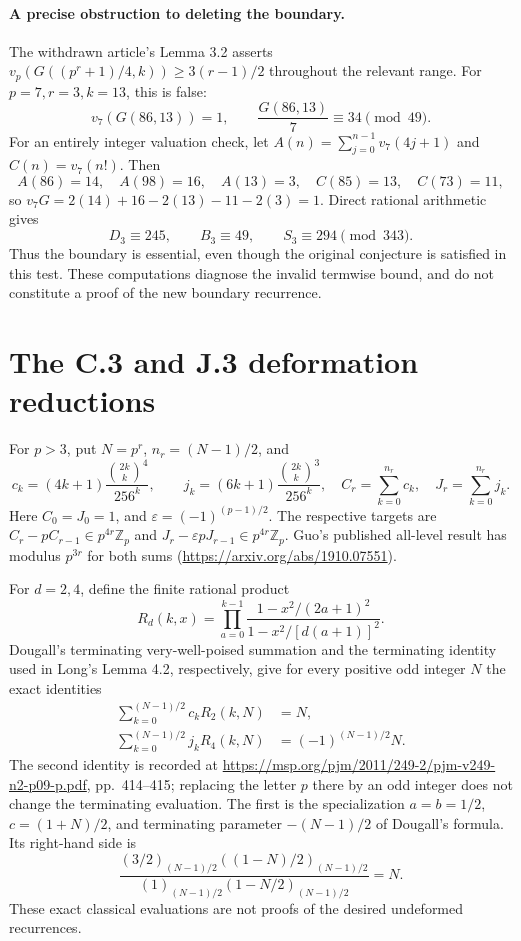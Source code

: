 \documentclass[11pt,letterpaper]{article}
\numberwithin{equation}{section}
\begin{document}
\paragraph{A precise obstruction to deleting the boundary.}
The withdrawn article's Lemma 3.2 asserts
$v_p(G((p^r+1)/4,k))\ge3(r-1)/2$ throughout the relevant range.
For $p=7,r=3,k=13$, this is false:
\[
 v_7(G(86,13))=1,
 \qquad \frac{G(86,13)}7\equiv34\pmod{49}.
\]
For an entirely integer valuation check, let
$A(n)=\sum_{j=0}^{n-1}v_7(4j+1)$ and
$C(n)=v_7(n!)$. Then
\[
 A(86)=14,\quad A(98)=16,\quad A(13)=3,\quad
 C(85)=13,\quad C(73)=11,
\]
so $v_7G=2(14)+16-2(13)-11-2(3)=1$.
Direct rational arithmetic gives
\[
 D_3\equiv245,\qquad B_3\equiv49,\qquad S_3\equiv294\pmod{343}.
\]
Thus the boundary is essential, even though the original conjecture is
satisfied in this test. These computations diagnose the invalid termwise
bound, and do not constitute a proof of the new boundary recurrence.

\section{The C.3 and J.3 deformation reductions}\label{loc-I-5}
For $p>3$, put $N=p^r$, $n_r=(N-1)/2$, and
\[
 c_k=(4k+1)\frac{\binom{2k}{k}^{4}}{256^k},\qquad
 j_k=(6k+1)\frac{\binom{2k}{k}^{3}}{256^k},\quad
 C_r=\sum_{k=0}^{n_r}c_k,\quad J_r=\sum_{k=0}^{n_r}j_k.
\]
Here $C_0=J_0=1$, and $\varepsilon=(-1)^{(p-1)/2}$.
The respective targets are
$C_r-pC_{r-1}\in p^{4r}\mathbb Z_p$ and
$J_r-\varepsilon pJ_{r-1}\in p^{4r}\mathbb Z_p$.
Guo's published all-level result has modulus $p^{3r}$ for both sums
(\url{https://arxiv.org/abs/1910.07551}).

For $d=2,4$, define the finite rational product
\[
 R_d(k,x)=\prod_{a=0}^{k-1}
 \frac{1-x^2/(2a+1)^2}{1-x^2/[d(a+1)]^2}.
\]
Dougall's terminating very-well-poised summation and the terminating
identity used in Long's Lemma 4.2, respectively, give for every positive
odd integer $N$ the exact identities
\begin{align}
 \sum_{k=0}^{(N-1)/2}c_k R_2(k,N)&=N,\\
 \sum_{k=0}^{(N-1)/2}j_k R_4(k,N)&=(-1)^{(N-1)/2}N.
\end{align}
The second identity is recorded at
\url{https://msp.org/pjm/2011/249-2/pjm-v249-n2-p09-p.pdf},
pp.~414--415; replacing the letter $p$ there by an odd integer does not
change the terminating evaluation. The first is the specialization
$a=b=1/2$, $c=(1+N)/2$, and terminating parameter $-(N-1)/2$ of
Dougall's formula. Its right-hand side is
\[
 \frac{(3/2)_{(N-1)/2}((1-N)/2)_{(N-1)/2}}
 {(1)_{(N-1)/2}(1-N/2)_{(N-1)/2}}=N.
\]
These exact classical evaluations are not proofs of the desired
undeformed recurrences.
\end{document}
